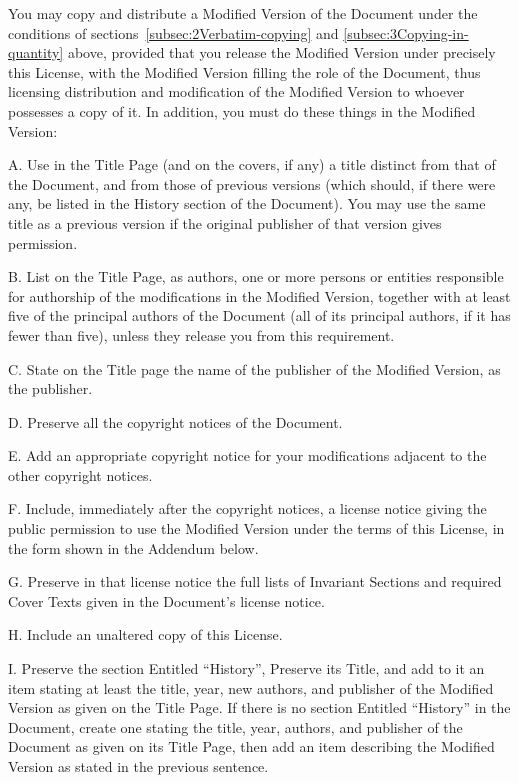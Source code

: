 You may copy and distribute a Modified Version of the Document under
the conditions of sections~\ref{subsec:2Verbatim-copying} and \ref{subsec:3Copying-in-quantity}
above, provided that you release the Modified Version under precisely
this License, with the Modified Version filling the role of the Document,
thus licensing distribution and modification of the Modified Version
to whoever possesses a copy of it. In addition, you must do these
things in the Modified Version:

A. Use in the Title Page (and on the covers, if any) a title distinct
from that of the Document, and from those of previous versions (which
should, if there were any, be listed in the History section of the
Document). You may use the same title as a previous version if the
original publisher of that version gives permission.

B. List on the Title Page, as authors, one or more persons or entities
responsible for authorship of the modifications in the Modified Version,
together with at least five of the principal authors of the Document
(all of its principal authors, if it has fewer than five), unless
they release you from this requirement.

C. State on the Title page the name of the publisher of the Modified
Version, as the publisher.

D. Preserve all the copyright notices of the Document.

E. Add an appropriate copyright notice for your modifications adjacent
to the other copyright notices.

F. Include, immediately after the copyright notices, a license notice
giving the public permission to use the Modified Version under the
terms of this License, in the form shown in the Addendum below.

G. Preserve in that license notice the full lists of Invariant Sections
and required Cover Texts given in the Document's license notice.

H. Include an unaltered copy of this License.

I. Preserve the section Entitled ``History'', Preserve its Title,
and add to it an item stating at least the title, year, new authors,
and publisher of the Modified Version as given on the Title Page.
If there is no section Entitled ``History'' in the Document, create
one stating the title, year, authors, and publisher of the Document
as given on its Title Page, then add an item describing the Modified
Version as stated in the previous sentence.

